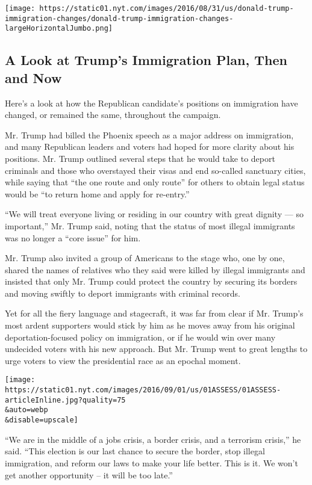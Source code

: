\href{https://www.nytimes.com/interactive/2016/08/31/us/politics/donald-trump-immigration-changes.html}{}

\texttt{[image: https://static01.nyt.com/images/2016/08/31/us/donald-trump-immigration-changes/donald-trump-immigration-changes-largeHorizontalJumbo.png]}

\hypertarget{a-look-at-trumps-immigration-plan-then-and-now}{%
\subsection{A Look at Trump's Immigration Plan, Then and
Now}\label{a-look-at-trumps-immigration-plan-then-and-now}}

Here's a look at how the Republican candidate's positions on immigration
have changed, or remained the same, throughout the campaign.

Mr. Trump had billed the Phoenix speech as a major address on
immigration, and many Republican leaders and voters had hoped for more
clarity about his positions. Mr. Trump outlined several steps that he
would take to deport criminals and those who overstayed their visas and
end so-called sanctuary cities, while saying that ``the one route and
only route'' for others to obtain legal status would be ``to return home
and apply for re-entry.''

``We will treat everyone living or residing in our country with great
dignity --- so important,'' Mr. Trump said, noting that the status of
most illegal immigrants was no longer a ``core issue'' for him.

Mr. Trump also invited a group of Americans to the stage who, one by
one, shared the names of relatives who they said were killed by illegal
immigrants and insisted that only Mr. Trump could protect the country by
securing its borders and moving swiftly to deport immigrants with
criminal records.

Yet for all the fiery language and stagecraft, it was far from clear if
Mr. Trump's most ardent supporters would stick by him as he moves away
from his original deportation-focused policy on immigration, or if he
would win over many undecided voters with his new approach. But Mr.
Trump went to great lengths to urge voters to view the presidential race
as an epochal moment.

\texttt{[image: https://static01.nyt.com/images/2016/09/01/us/01ASSESS/01ASSESS-articleInline.jpg?quality=75\\\&auto=webp\\\&disable=upscale]}

``We are in the middle of a jobs crisis, a border crisis, and a
terrorism crisis,'' he said. ``This election is our last chance to
secure the border, stop illegal immigration, and reform our laws to make
your life better. This is it. We won't get another opportunity -- it
will be too late.''


